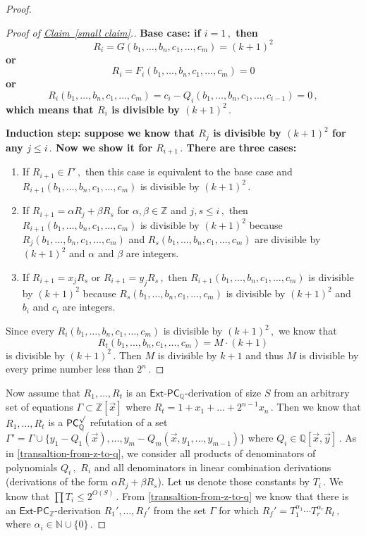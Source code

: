 \documentclass[11pt]{article}
\newcommand{\expref}[2]{\texorpdfstring{\hyperref[#2]{#1~\ref{#2}}}{#1~\ref{#2}}}
\newcommand{\Q}{{\mathbb Q}}
\newcommand{\Z}{{\mathbb Z}}
\begin{document}
\begin{proof}
\begin{proof}[Proof of \expref{Claim}{small claim}.]
\bfseries Base case: \mdseries if %
$i = 1\,,$ %
 then
$$
R_i = G(b_1, \ldots, b_n, c_1, \ldots, c_m) = (k + 1)^2 
$$
or
$$
R_i = F_i(b_1, \ldots, b_n,  c_1, \ldots, c_m) = 0
$$
or
$$
%
R_i(b_1, \ldots, b_n, c_1, \ldots, c_m) = c_i - Q_i(b_1, \ldots, b_n, c_1, \ldots, c_{i - 1}) = 0\,, %
$$
which means that $R_i$ is divisible by %
$(k + 1)^2\,.$ %

\bfseries Induction step: \mdseries suppose we know that $R_j$ is divisible by $(k + 1)^2$ for any %
$j \le i\,.$ %
 Now we show it for %
$R_{i + 1}\,.$ %
 There are three cases:
\begin{enumerate}
    \item If %
$R_{i + 1} \in \Gamma'\,,$ %
 then this case is equivalent to the base case and $R_{i + 1}(b_1, \ldots, b_n, c_1, \ldots, c_m)$ is divisible by %
$(k + 1)^2\,.$ %
    \item If $R_{i + 1} = \alpha R_j + \beta R_s$ for $\alpha, \beta \in \Z$ and %
$j, s \le i\,,$ %
 then
    $R_{i + 1}(b_1, \ldots, b_n, c_1, \ldots, c_m)$ is divisible by $(k + 1)^2$ because $R_j(b_1, \ldots, b_n, c_1, \ldots, c_m)$ and $R_s(b_1, \ldots, b_n, c_1, \ldots, c_m)$ are divisible by $(k + 1)^2$ and $\alpha$ and $\beta$ are integers.
    \item If $R_{i + 1} = x_j R_s$ or %
$R_{i + 1} = y_j R_s\,,$ %
 then $R_{i + 1}(b_1, \ldots, b_n, c_1, \ldots, c_m)$ is divisible by $(k + 1)^2$ because $R_s(b_1, \ldots, b_n, c_1, \ldots, c_m)$ is divisible by $(k + 1)^2$ and $b_i$ and $c_i$ are integers.
\end{enumerate}
Since every $R_{i}(b_1, \ldots, b_n, c_1, \ldots, c_m)$ is divisible by %
$(k + 1)^2\,,$ %
we know that %
%
$$R_{t}(b_1, \ldots, b_n, c_1, \ldots, c_m) = M \cdot (k  + 1)$$   %
is divisible by %
$(k + 1)^2\,.$ %
 Then $M$ is divisible by $k + 1$ and thus $M$ is divisible by every
prime number less than %
$2^n\,.$ %
\end{proof}


%
Now assume that %
$R_1, \ldots, R_t$ %
 is an $\mathsf{Ext}$-$\mathsf{PC}_{\Q}$-derivation of size $S$ from an arbitrary set of equations $\Gamma \subset \Z[\vec x]$  where %
$R_t = 1 + x_1 + \ldots + 2^{n - 1}x_n\,.$ %
 Then we know that %
$R_1, \ldots, R_t$ %
 is a $\mathsf{PC}_{\Q}^{\surd}$ refutation of a set $\Gamma' = \Gamma \cup \{y_1 - Q_1(\vec x), \ldots, y_m - Q_m(\vec x, y_1, \ldots, y_{m - 1})\}$ where  %
$Q_i \in \Q[\vec x, \vec y]\,.$ %
 As in \autoref{transaltion-from-z-to-q}, we consider all products of denominators of polynomials %
$Q_i\,,$ %
 $R_i$ and all denominators in linear combination derivations (derivations of the form $\alpha R_j + \beta R_s$). Let us denote those constants by %
$T_i\,.$ %
 We know that %
$\prod T_i \le 2^{O(S)}\,.$ %
 From  \autoref{transaltion-from-z-to-q} we know that there is an $\mathsf{Ext}$-$\mathsf{PC}_{\Z}$-derivation %
$R_1', \ldots, R_f'$ %
 from the set $\Gamma$ for which %
$R_f' = T_1^{\alpha_1} \cdots T_r^{\alpha_r} R_t\,,$ %
 where %
$\alpha_i \in \mathbb{N} \cup \{0\}\,.$ %
%


\end{proof}
\end{document}
